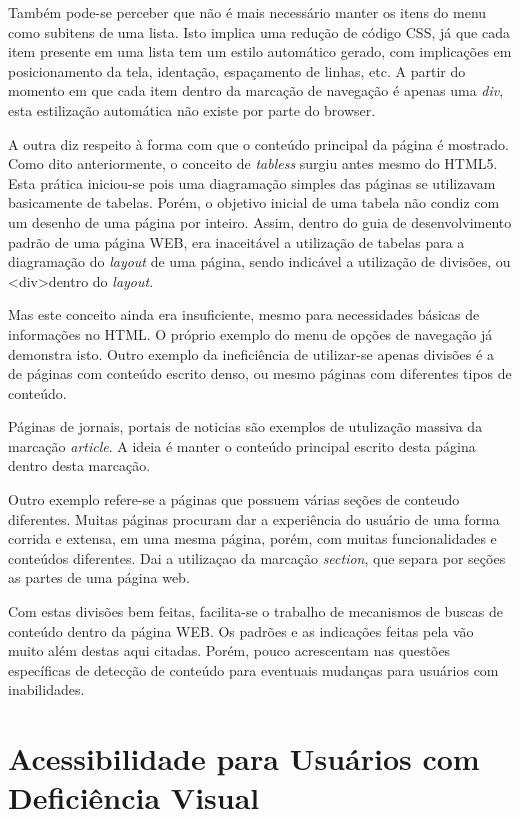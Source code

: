 \documentclass[
	12pt,				%
	oneside,			%
	a4paper,			%
	english,			%
	brazil				%
	]{abntex2ppgsi}
\begin{document}
Também pode-se perceber que não é mais necessário manter os itens do menu como subitens de uma lista. Isto implica uma redução de código CSS, já que cada item presente em uma lista tem um estilo automático gerado, com implicações em posicionamento da tela, identação, espaçamento de linhas, etc. A partir do momento em que cada item dentro da marcação de navegação é apenas uma \textit{div}, esta estilização automática não existe por parte do browser. 

A outra diz respeito à forma com que o conteúdo principal da página é mostrado. Como dito anteriormente, o conceito de \textit{tabless} surgiu antes mesmo do HTML5. Esta prática iniciou-se pois uma diagramação simples das páginas se utilizavam basicamente de tabelas. Porém, o objetivo inicial de uma tabela não condiz com um desenho de uma página por inteiro. Assim, dentro do guia de desenvolvimento padrão de uma página WEB, era inaceitável a utilização de tabelas para a diagramação do \textit{layout} de uma página, sendo indicável a utilização de divisões, ou \textless div\textgreater dentro do \textit{layout}. 

Mas este conceito ainda era insuficiente, mesmo para necessidades básicas de informações no HTML. O próprio exemplo do menu de opções de navegação já demonstra isto. Outro exemplo da ineficiência de utilizar-se apenas divisões é a de páginas com conteúdo escrito denso, ou mesmo páginas com diferentes tipos de conteúdo. 

Páginas de jornais, portais de noticias são exemplos de utulização massiva da marcação \textit{article}. A ideia é manter o conteúdo principal escrito desta página dentro desta marcação.

Outro exemplo refere-se a páginas que possuem várias seções de conteudo diferentes. Muitas páginas procuram dar a experiência do usuário de uma forma corrida e extensa, em uma mesma página, porém, com muitas funcionalidades e conteúdos diferentes. Dai a utilizaçao da marcação \textit{section}, que separa por seções as partes de uma página web.

Com estas divisões bem feitas, facilita-se o trabalho de mecanismos de buscas de conteúdo dentro da página WEB. Os padrões e as indicações feitas pela  vão muito além destas aqui citadas. Porém, pouco acrescentam nas questões específicas de detecção de conteúdo para eventuais mudanças para usuários com inabilidades.

\chapter{Acessibilidade para Usuários com Deficiência Visual}
\end{document}
